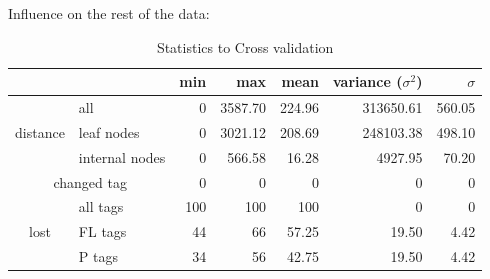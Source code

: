      Influence on the rest of the data:
      \begin{table}
        \begin{center}
          \begin{tabular}{ |cl||r|r|r|r|r| }
            \hline
            & & min & max & mean & variance ($\sigma^2$) & $\sigma$ \\
            \hline \hline
            \multirow{3}{*}{distance} & all   & 0 & 3587.70 & 224.96 & 313650.61 & 560.05 \\
            & leaf nodes                      & 0 & 3021.12 & 208.69 & 248103.38 & 498.10 \\
            & internal nodes                  & 0 & 566.58 & 16.28 & 4927.95 & 70.20 \\ \hline
            \multicolumn{2}{|c||}{changed tag} & 0 & 0 & 0 & 0 & 0 \\ \hline
            \multirow{3}{*}{lost} & all tags  & 100 & 100 & 100 & 0 & 0 \\
            & FL tags                         & 44 & 66 & 57.25 & 19.50 & 4.42 \\
            & P tags                          & 34 & 56 & 42.75 & 19.50 & 4.42 \\
            \hline
          \end{tabular}
        \end{center}
        \caption{Statistics to Cross validation}
      \end{table}

